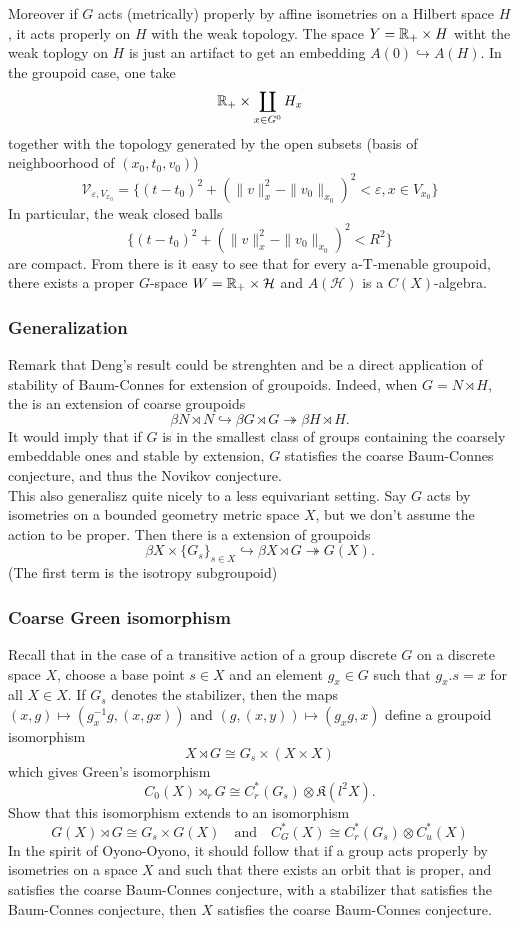 Moreover if $G$ acts (metrically) properly by affine isometries on a Hilbert space $H$, it acts properly on $H$ with the weak topology. The space $Y = \mathbb R_+ \times H$ witht the weak toplogy on $H$ is just an artifact to get an embedding $A(0) \hookrightarrow A(H)$. In the groupoid case, one take
\[ \mathbb R_+ \times \coprod_{x\in G^0} H_x\]
together with the topology generated by the open subsets (basis of neighboorhood of $(x_0,t_0,v_0)$)
\[ \mathcal V_{\varepsilon, V_{x_0}} = \{ (t-t_0)^2 + (\| v\|_x^2 - \| v_0\|_{x_0} )^2 < \varepsilon , x\in V_{x_0}\} \]
In particular, the weak closed balls
\[  \{ (t-t_0)^2 + (\| v\|_x^2 - \| v_0\|_{x_0} )^2 < R^2 \}\]
are compact. From there is it easy to see that for every a-T-menable groupoid, there exists a proper $G$-space $W= \mathbb R_+\times \mathcal H$ and $A(\mathcal H)$ is a $C(X)$-algebra.

\subsubsection*{Generalization}

Remark that Deng's result could be strenghten and be a direct application of stability of Baum-Connes for extension of groupoids. Indeed, when $G=N\rtimes H$, the is an extension of coarse groupoids
\[ \beta N \rtimes N\hookrightarrow  \beta G \rtimes G \twoheadrightarrow \beta H \rtimes H.\]
It would imply that if $G$ is in the smallest class of groups containing the coarsely embeddable ones and stable by extension, $G$ statisfies the coarse Baum-Connes conjecture, and thus the Novikov conjecture.\\

This also generalisz quite nicely to a less equivariant setting. Say $G$ acts by isometries on a bounded geometry metric space $X$, but we don't assume the action to be proper. Then there is a extension of groupoids
\[ \beta X \times \{G_s\}_{s\in X} \hookrightarrow  \beta X \rtimes G \twoheadrightarrow G(X).\]
(The first term is the isotropy subgroupoid)

\subsubsection*{Coarse Green isomorphism}

Recall that in the case of a transitive action of a group discrete $G$ on a discrete space $X$, choose a base point $s\in X$ and an element $g_x\in G$ such that $g_x .s =x$ for all $X\in X$. If $G_s$ denotes the stabilizer, then the maps $(x,g)\mapsto (g^{-1}_x g , (x , gx))$ and $(g, (x,y))\mapsto (g_x g, x) $ define a groupoid isomorphism
\[ X\rtimes G \cong G_s \times (X\times X)\]
which gives Green's isomorphism
\[C_0(X)\rtimes_r G \cong C^*_r(G_s) \otimes \mathfrak K(l^2 X).\]
Show that this isomorphism extends to an isomorphism
\[G(X)\rtimes G \cong G_s \times G(X) \quad \text{and} \quad 
C^*_G(X) \cong C_r^*(G_s) \otimes C^*_u(X)\]
In the spirit of Oyono-Oyono, it should follow that if a group acts properly by isometries on a space $X$ and such that there exists an orbit that is proper, and satisfies the coarse Baum-Connes conjecture, with a stabilizer that satisfies the Baum-Connes conjecture, then $X$ satisfies the coarse Baum-Connes conjecture. \\ 

